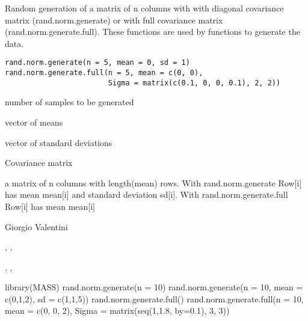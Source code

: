 \documentclass{article}
\begin{document}
\begin{Description}\relax
Random generation of a matrix of n columns with with diagonal covariance matrix (rand.norm.generate)
or with full covariance matrix (rand.norm.generate.full). These functions are used by 
functions  to generate the data.
\end{Description}
\begin{Usage}
\begin{verbatim}
rand.norm.generate(n = 5, mean = 0, sd = 1)
rand.norm.generate.full(n = 5, mean = c(0, 0), 
                        Sigma = matrix(c(0.1, 0, 0, 0.1), 2, 2))
\end{verbatim}
\end{Usage}
\begin{Arguments}
\begin{ldescription}
\item[\code{n}] number of samples to be generated 
\item[\code{mean}] vector of means 
\item[\code{sd}] vector of standard deviations 
\item[\code{Sigma}] Covariance matrix  
\end{ldescription}
\end{Arguments}
\begin{Value}
a matrix of n columns with length(mean) rows. 
With rand.norm.generate Row[i] has mean mean[i] and standard deviation sd[i].
With rand.norm.generate.full Row[i] has mean mean[i]
\end{Value}
\begin{Author}\relax
Giorgio Valentini 
\end{Author}
\begin{SeeAlso}\relax
{}, , 

, , 
\end{SeeAlso}
\begin{Examples}
\begin{ExampleCode}
library(MASS)
rand.norm.generate(n = 10)
rand.norm.generate(n = 10, mean = c(0,1,2), sd = c(1,1,5))
rand.norm.generate.full()
rand.norm.generate.full(n = 10, mean = c(0, 0, 2), 
                        Sigma = matrix(seq(1,1.8, by=0.1), 3, 3))
\end{ExampleCode}
\end{Examples}
\end{document}
